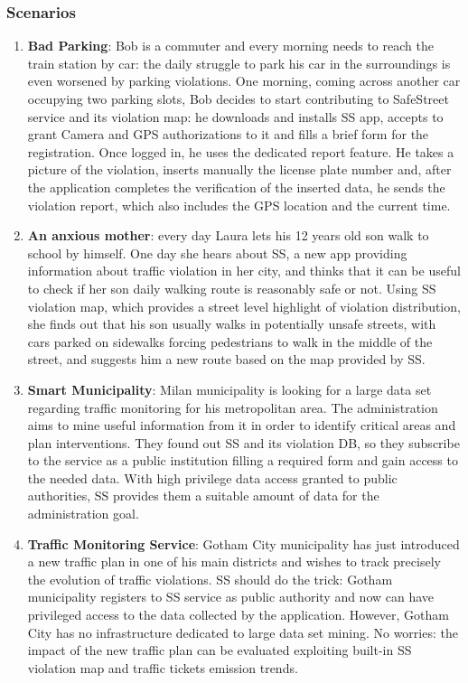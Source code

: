 	\subsubsection{Scenarios}
	\begin{enumerate}
	\item \textbf{Bad Parking}: Bob is a commuter and every morning needs to reach the train station by car: the daily struggle to park his car in the surroundings is even worsened by parking violations. One morning, coming across another car occupying two parking slots, Bob decides to start contributing to SafeStreet service and its violation map: he downloads and installs SS app, accepts to grant Camera and GPS authorizations to it and fills a brief form for the registration. Once logged in, he uses the dedicated report feature. He takes a picture of the violation, inserts manually the license plate number and, after the application completes the verification of the inserted data, he sends the violation report, which also includes the GPS location and the current time.
 	\item \textbf{An anxious mother}: every day Laura lets his 12 years old son walk to school by himself. One day she hears about SS, a new app providing information about traffic violation in her city, and thinks that it can be useful to check if her son daily walking route is reasonably safe or not. Using SS violation map, which provides a street level highlight of violation distribution, she finds out that his son usually walks in potentially unsafe streets, with cars parked on sidewalks forcing pedestrians to walk in the middle of the street, and suggests him a new route based on the map provided by SS.
	\item \textbf{Smart Municipality}: Milan municipality is looking for a large data set regarding traffic monitoring for his metropolitan area. The administration aims to mine useful information from it in order to identify critical areas and plan interventions. They found out SS and its violation DB, so they subscribe to the service as a public institution filling a required form and gain access to the needed data. With high privilege data access granted to public authorities, SS provides them a suitable amount of data for the administration goal.
	\item \textbf{Traffic Monitoring Service}: Gotham City municipality has just introduced a new traffic plan in one of his main districts and wishes to track precisely the evolution of traffic violations. SS should do the trick: Gotham municipality registers to SS service as public authority and now can have privileged access to the data collected by the application. However, Gotham City has no infrastructure dedicated to large data set mining. No worries: the impact of the new traffic plan can be evaluated exploiting built-in SS violation map and traffic tickets emission trends.

\end{enumerate}
